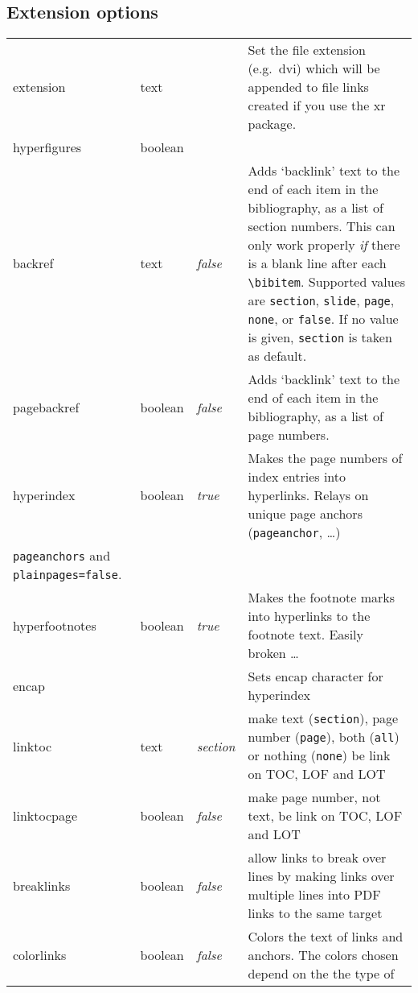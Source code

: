 \documentclass[pdftex]{article}
\newcommand*{\xpackage}[1]{\textsf{#1}}
\begin{document}
\subsection{Extension options}
\begin{longtable}{@{}>{\ttfamily}ll>{\itshape}lp{5.5cm}@{}}
extension      & text    &         & Set the file extension (e.g.\ \textsf{dvi}) which will be appended to file links
                                     created if you use the \xpackage{xr} package. \\
hyperfigures   & boolean &         & \\
backref        & text    & false   & Adds `backlink' text to the end of each item in the bibliography, as a list of
                                     section numbers. This can only work properly \emph{if} there is a blank line after
                                     each \verb|\bibitem|. Supported values are \verb|section|, \verb|slide|, \verb|page|,
                                     \verb|none|, or \verb|false|. If no value is given, \verb|section| is taken as default.\\
pagebackref    & boolean & false   & Adds `backlink' text to the end of each item in the bibliography, as a list of page
                                     numbers. \\
hyperindex     & boolean & true    & Makes the page numbers of index entries into hyperlinks. Relays on unique
                                     page anchors (\verb|pageanchor|, \ldots)\\
                                     \verb|pageanchors| and \verb|plainpages=false|. \\
hyperfootnotes & boolean & true    & Makes the footnote marks into hyperlinks to the footnote text.
                                     Easily broken \ldots\\
encap          &         &         & Sets encap character for hyperindex \\
linktoc        & text    & section & make text (\verb|section|), page number (\verb|page|), both (\verb|all|) or nothing (\verb|none|) be link on TOC, LOF and LOT \\
linktocpage    & boolean & false   & make page number, not text, be link on TOC, LOF and LOT \\
breaklinks     & boolean & false   & allow links to break over lines by making links over multiple lines into PDF links to
                                     the same target \\
colorlinks     & boolean & false   & Colors the text of links and anchors. The colors chosen depend on the the type of

\end{longtable}
\end{document}
